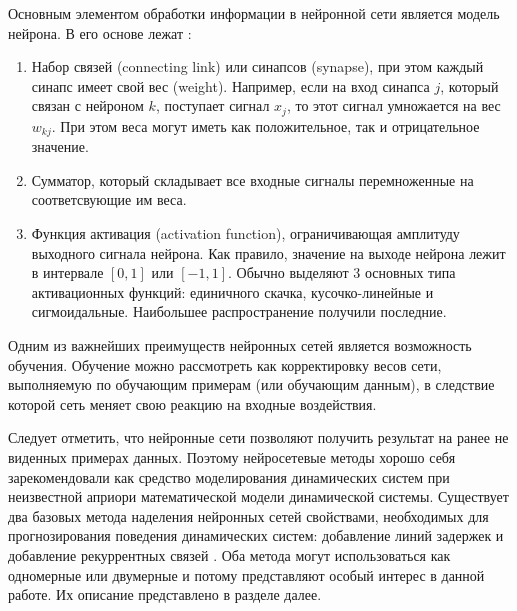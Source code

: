 \documentclass[a4paper,14pt,russian]{extreport}
\begin{document}
Основным элементом обработки информации в нейронной сети является модель 
нейрона. В его основе лежат \cite{haykin1999}:
\begin{enumerate}
	\item Набор связей (connecting link) или синапсов (synapse), при этом 
		каждый синапс имеет свой вес (weight). Например, если на вход 
		синапса $j$, который связан с нейроном $k$, поступает сигнал $x_j$, то 
		этот сигнал умножается на вес $w_{k j}$. При этом веса могут иметь
		как положительное, так и отрицательное значение.
	\item Сумматор, который складывает все входные сигналы перемноженные 
		на соответсвующие им веса.
	\item Функция активация (activation function), ограничивающая амплитуду 
		выходного сигнала нейрона. Как правило, значение на выходе нейрона 
		лежит в интервале $[0, 1]$ или $[-1, 1]$. Обычно выделяют 3 основных 
		типа активационных функций: единичного скачка, кусочко-линейные и 
		сигмоидальные. Наибольшее распространение получили последние.
\end{enumerate}

Одним из важнейших преимуществ нейронных сетей является возможность 
обучения. Обучение можно рассмотреть как корректировку весов сети, 
выполняемую по обучающим примерам (или обучающим данным), в следствие 
которой сеть меняет свою реакцию на входные воздействия.

Следует отметить, что нейронные сети позволяют получить результат на ранее 
не виденных примерах данных. Поэтому нейросетевые методы хорошо себя 
зарекомендовали как средство моделирования динамических систем при 
неизвестной априори математической модели динамической системы. 
Существует два базовых метода наделения нейронных сетей свойствами, 
необходимых для прогнозирования поведения динамических систем: 
добавление линий задержек и добавление рекуррентных связей
\cite{chernodub2012}. Оба метода могут использоваться как одномерные или 
двумерные и потому представляют особый интерес в данной работе. Их 
описание представлено в разделе далее.
\end{document}
